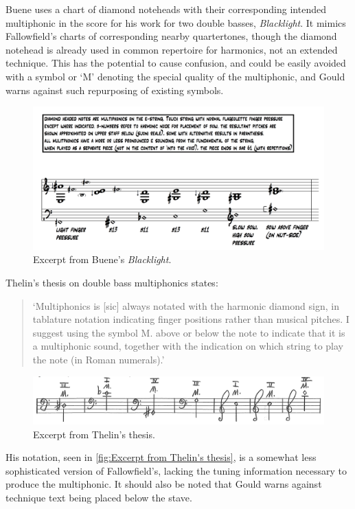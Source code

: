 Buene uses a chart of diamond noteheads with their corresponding intended multiphonic in the score for his work for two double basses, \emph{Blacklight}.\autocite[39--42]{thelinMultiphonicsDoubleBass2011}
It mimics Fallowfield's charts of corresponding nearby quartertones, though the diamond notehead is already used in common repertoire for harmonics, not an extended technique. 
This has the potential to cause confusion, and could be easily avoided with a symbol or `M' denoting the special quality of the multiphonic, and Gould warns against such repurposing of existing symbols.\autocite[494]{gouldBars2011}

\begin{figure}
  \includegraphics[width=\linewidth]{./resources/bueneMultiphonicNotation.png}
  \caption{Excerpt from Buene's \emph{Blacklight}.}\label{fig:Excerpt from Buene's Blacklight}\end{figure}

Thelin's thesis on double bass multiphonics states:
\begin{quotation}
    `Multiphonics is [sic] always notated with the harmonic diamond sign, in tablature notation
indicating finger positions rather than musical pitches. I suggest using the symbol M. above or
below the note to indicate that it is a multiphonic sound, together with the indication on which
string to play the note (in Roman numerals).'\autocite[6]{thelinMultiphonicsDoubleBass2011}
\end{quotation}


\begin{figure}
    \includegraphics[width=\linewidth]{./resources/thelinMultiphonicNotation.png}
    \caption{Excerpt from Thelin's thesis.}\label{fig:Excerpt from Thelin's thesis}\end{figure}
His notation, seen in \autoref{fig:Excerpt from Thelin's thesis}, is a somewhat less sophisticated version of Fallowfield's, lacking the tuning information necessary to produce the multiphonic. 
It should also be noted that Gould warns against technique text being placed below the stave.\autocite[492]{gouldBars2011}

